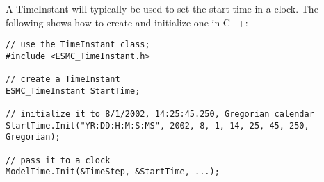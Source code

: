 
A TimeInstant will typically be used to set the start time in a
clock.  The following shows how to create and initialize one in C++:

\begin{verbatim}
// use the TimeInstant class;
#include <ESMC_TimeInstant.h>

// create a TimeInstant
ESMC_TimeInstant StartTime;

// initialize it to 8/1/2002, 14:25:45.250, Gregorian calendar
StartTime.Init("YR:DD:H:M:S:MS", 2002, 8, 1, 14, 25, 45, 250, Gregorian);

// pass it to a clock
ModelTime.Init(&TimeStep, &StartTime, ...);
\end{verbatim}
